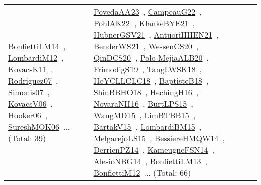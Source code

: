 {\begin{longtable}{lp{3cm}>{\raggedright\arraybackslash}p{6cm}>{\raggedright\arraybackslash}p{6cm}>{\raggedright\arraybackslash}p{8cm}}
\href{works/BonfiettiLM14.pdf}{BonfiettiLM14}~\cite{BonfiettiLM14}, \href{works/LombardiM12.pdf}{LombardiM12}~\cite{LombardiM12}, \href{works/KovacsK11.pdf}{KovacsK11}~\cite{KovacsK11}, \href{works/Rodriguez07.pdf}{Rodriguez07}~\cite{Rodriguez07}, \href{works/Simonis07.pdf}{Simonis07}~\cite{Simonis07}, \href{works/KovacsV06.pdf}{KovacsV06}~\cite{KovacsV06}, \href{works/Hooker06.pdf}{Hooker06}~\cite{Hooker06}, \href{works/SureshMOK06.pdf}{SureshMOK06}~\cite{SureshMOK06}... (Total: 39) & \href{works/PovedaAA23.pdf}{PovedaAA23}~\cite{PovedaAA23}, \href{works/CampeauG22.pdf}{CampeauG22}~\cite{CampeauG22}, \href{works/PohlAK22.pdf}{PohlAK22}~\cite{PohlAK22}, \href{works/KlankeBYE21.pdf}{KlankeBYE21}~\cite{KlankeBYE21}, \href{works/HubnerGSV21.pdf}{HubnerGSV21}~\cite{HubnerGSV21}, \href{works/AntuoriHHEN21.pdf}{AntuoriHHEN21}~\cite{AntuoriHHEN21}, \href{works/BenderWS21.pdf}{BenderWS21}~\cite{BenderWS21}, \href{works/WessenCS20.pdf}{WessenCS20}~\cite{WessenCS20}, \href{works/QinDCS20.pdf}{QinDCS20}~\cite{QinDCS20}, \href{works/Polo-MejiaALB20.pdf}{Polo-MejiaALB20}~\cite{Polo-MejiaALB20}, \href{works/FrimodigS19.pdf}{FrimodigS19}~\cite{FrimodigS19}, \href{works/TangLWSK18.pdf}{TangLWSK18}~\cite{TangLWSK18}, \href{works/HoYCLLCLC18.pdf}{HoYCLLCLC18}~\cite{HoYCLLCLC18}, \href{works/BaptisteB18.pdf}{BaptisteB18}~\cite{BaptisteB18}, \href{works/ShinBBHO18.pdf}{ShinBBHO18}~\cite{ShinBBHO18}, \href{works/HechingH16.pdf}{HechingH16}~\cite{HechingH16}, \href{works/NovaraNH16.pdf}{NovaraNH16}~\cite{NovaraNH16}, \href{works/BurtLPS15.pdf}{BurtLPS15}~\cite{BurtLPS15}, \href{works/WangMD15.pdf}{WangMD15}~\cite{WangMD15}, \href{works/LimBTBB15.pdf}{LimBTBB15}~\cite{LimBTBB15}, \href{works/BartakV15.pdf}{BartakV15}~\cite{BartakV15}, \href{works/LombardiBM15.pdf}{LombardiBM15}~\cite{LombardiBM15}, \href{works/MelgarejoLS15.pdf}{MelgarejoLS15}~\cite{MelgarejoLS15}, \href{works/BessiereHMQW14.pdf}{BessiereHMQW14}~\cite{BessiereHMQW14}, \href{works/DerrienPZ14.pdf}{DerrienPZ14}~\cite{DerrienPZ14}, \href{works/KameugneFSN14.pdf}{KameugneFSN14}~\cite{KameugneFSN14}, \href{works/AlesioNBG14.pdf}{AlesioNBG14}~\cite{AlesioNBG14}, \href{works/BonfiettiLM13.pdf}{BonfiettiLM13}~\cite{BonfiettiLM13}, \href{works/BonfiettiM12.pdf}{BonfiettiM12}~\cite{BonfiettiM12}... (Total: 66)\\

\end{longtable}}
